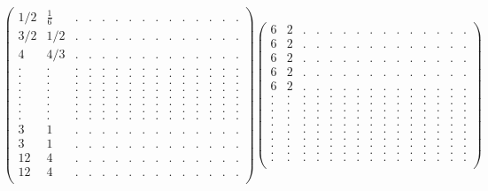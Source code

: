 \documentclass[12pt,a4paper]{amsart}
\begin{document}
\begin{align*}
\left(\begin{array}{rrrrrrrrrrrrrrr}%
1/2&\frac{1}{6}&.&.&.&.&.&.&.&.&.&.&.&.&.\\%
3/2&1/2&.&.&.&.&.&.&.&.&.&.&.&.&.\\%
4&4/3&.&.&.&.&.&.&.&.&.&.&.&.&.\\%
.&.&.&.&.&.&.&.&.&.&.&.&.&.&.\\%
.&.&.&.&.&.&.&.&.&.&.&.&.&.&.\\%
.&.&.&.&.&.&.&.&.&.&.&.&.&.&.\\%
.&.&.&.&.&.&.&.&.&.&.&.&.&.&.\\%
.&.&.&.&.&.&.&.&.&.&.&.&.&.&.\\%
.&.&.&.&.&.&.&.&.&.&.&.&.&.&.\\%
.&.&.&.&.&.&.&.&.&.&.&.&.&.&.\\%
.&.&.&.&.&.&.&.&.&.&.&.&.&.&.\\%
3&1&.&.&.&.&.&.&.&.&.&.&.&.&.\\%
3&1&.&.&.&.&.&.&.&.&.&.&.&.&.\\%
12&4&.&.&.&.&.&.&.&.&.&.&.&.&.\\%
12&4&.&.&.&.&.&.&.&.&.&.&.&.&.\\%
\end{array}\right)%
\left(\begin{array}{rrrrrrrrrrrrrrr}%
6&2&.&.&.&.&.&.&.&.&.&.&.&.&.\\%
6&2&.&.&.&.&.&.&.&.&.&.&.&.&.\\%
6&2&.&.&.&.&.&.&.&.&.&.&.&.&.\\%
6&2&.&.&.&.&.&.&.&.&.&.&.&.&.\\%
6&2&.&.&.&.&.&.&.&.&.&.&.&.&.\\%
.&.&.&.&.&.&.&.&.&.&.&.&.&.&.\\%
.&.&.&.&.&.&.&.&.&.&.&.&.&.&.\\%
.&.&.&.&.&.&.&.&.&.&.&.&.&.&.\\%
.&.&.&.&.&.&.&.&.&.&.&.&.&.&.\\%
.&.&.&.&.&.&.&.&.&.&.&.&.&.&.\\%
.&.&.&.&.&.&.&.&.&.&.&.&.&.&.\\%
.&.&.&.&.&.&.&.&.&.&.&.&.&.&.\\%
.&.&.&.&.&.&.&.&.&.&.&.&.&.&.\\%
.&.&.&.&.&.&.&.&.&.&.&.&.&.&.\\%
.&.&.&.&.&.&.&.&.&.&.&.&.&.&.\\%
\end{array}\right)%
\end{align*}
\end{document}
